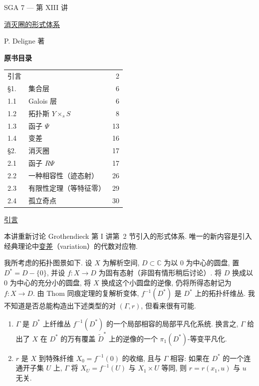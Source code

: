 \clearpage
\ExposeTOC
\begin{center}
{\large SGA 7 --- 第 XIII 讲}\par
\vspace{2em}
{\Large\underline{消灭圈的形式体系}}\par
\vspace{1.5em}
{\large P. Deligne 著}
\end{center}

\medskip
\noindent\textbf{原书目录}
\begin{center}
\begin{tabular}{@{}llr@{}}
引言 && 2\\
\S1. & 集合层 & 6\\
1.1 & Galois 层 & 6\\
1.2 & 拓扑斯 $Y\times_s S$ & 8\\
1.3 & 函子 $\Psi$ & 13\\
1.4 & 变差 & 16\\
\S2. & 消灭圈 & 17\\
2.1 & 函子 $R\Psi$ & 17\\
2.2 & 一种相容性（迹态射） & 26\\
2.3 & 有限性定理（等特征零） & 29\\
2.4 & 孤立奇点 & 30
\end{tabular}
\end{center}


\medskip
\underline{引言}

本讲重新讨论 Grothendieck 第 I 讲第~2 节引入的形式体系. 唯一的新内容是引入经典理论中\underline{变差}（variation）的代数对应物.

我所考虑的拓扑图景如下. 设 $X$ 为解析空间, $D\subset\mathbb C$ 为以 $0$ 为中心的圆盘, 置 $D^*=D-\{0\}$, 并设 $f:X\longrightarrow D$ 为固有态射（非固有情形稍后讨论）. 将 $D$ 换成以 $0$ 为中心的充分小的圆盘, 将 $X$ 换成这个小圆盘的逆像, 仍将所得态射记为 $f:X\longrightarrow D$. 由 Thom 同痕定理的复解析变体, $f^{-1}(D^*)$ 是 $D^*$ 上的拓扑纤维丛. 我不知道是否总能构造出下述类型的对 $(\Gamma,r)$, 但看来很有可能.

\begin{enumerate}[label=(\alph*),leftmargin=2.6em]
\item $\Gamma$ 是 $D^*$ 上纤维丛 $f^{-1}(D^*)$ 的一个局部相容的局部平凡化系统. 换言之, $\Gamma$ 给出了 $X$ 在 $D^*$ 的万有覆盖 $\widetilde D^*$ 上的逆像的一个 $\pi_1(D^*)$-等变平凡化.

\item $r$ 是 $X$ 到特殊纤维 $X_0=f^{-1}(0)$ 的收缩, 且与 $\Gamma$ 相容: 如果在 $D^*$ 的一个连通开子集 $U$ 上, $\Gamma$ 将 $X_U=f^{-1}(U)$ 与 $X_1\times U$ 等同, 则 $r=r(x_1,u)$ 与 $u$ 无关.
\end{enumerate}

